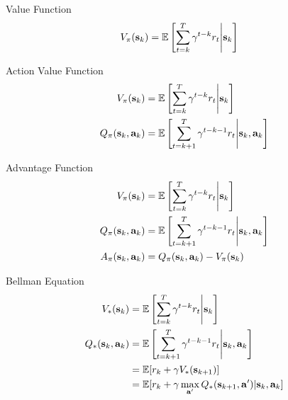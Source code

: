 \documentclass[notes]{beamer} %
\begin{document}
\begin{frame}{Value Function}
  \begin{align*}
    V_\pi(\mathbf{s}_k) &= \mathbb{E}\left[\sum_{t=k}^{T}
    \gamma^{t-k} r_t \middle| \mathbf{s}_k\right]
  \end{align*}
\end{frame}

\begin{frame}{Action Value Function}
  \begin{align*}
    V_\pi(\mathbf{s}_k) &= \mathbb{E}\left[\sum_{t=k}^{T}
                    \gamma^{t-k} r_t \middle| \mathbf{s}_k\right] \\
    Q_\pi(\mathbf{s}_k, \mathbf{a}_k) &= \mathbb{E}\left[\sum_{t=k+1}^{T}
                    \gamma^{t-k-1} r_t \middle| \mathbf{s}_k, \mathbf{a}_k \right]
  \end{align*}
\end{frame}

\begin{frame}{Advantage Function}
  \begin{align*}
    V_\pi(\mathbf{s}_k) &= \mathbb{E}\left[\sum_{t=k}^{T}
                    \gamma^{t-k} r_t \middle| \mathbf{s}_k\right] \\
    Q_\pi(\mathbf{s}_k, \mathbf{a}_k) &= \mathbb{E}\left[\sum_{t=k+1}^{T}
                            \gamma^{t-k-1} r_t \middle| \mathbf{s}_k, \mathbf{a}_k \right]
    \\
    A_\pi(\mathbf{s}_k, \mathbf{a}_k) &= Q_\pi(\mathbf{s}_k, \mathbf{a}_k) - V_\pi(\mathbf{s}_k)
  \end{align*}
\end{frame}

\begin{frame}{Bellman Equation}
  \begin{align*}
    V_*(\mathbf{s}_k) &= \mathbb{E}\left[\sum_{t=k}^{T}
                    \gamma^{t-k} r_t \middle| \mathbf{s}_k\right] \\
    Q_*(\mathbf{s}_k, \mathbf{a}_k) &= \mathbb{E}\left[\sum_{t=k+1}^{T}
                            \gamma^{t-k-1} r_t \middle| \mathbf{s}_k, \mathbf{a}_k \right]
                          \\
    &= \mathbb{E}[r_k + \gamma V_*(\mathbf{s}_{k+1})] \\
    &= \mathbb{E}[r_k + \gamma \max_{\mathbf{a}'} Q_*(\mathbf{s}_{k+1}, \mathbf{a}') | \mathbf{s}_k, \mathbf{a}_k]
  \end{align*}
\end{frame}
\end{document}
